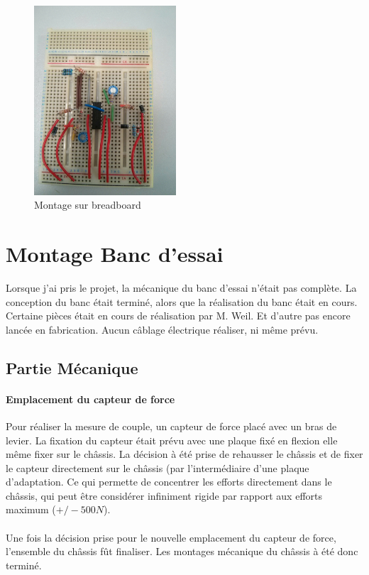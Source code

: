\documentclass[11pt]{article}
\begin{document}
\begin{figure}[!h]
    \centering
    \includegraphics[width=200px]{IMG_20160629_203932.jpg}
    \caption{Montage sur breadboard}
\end{figure}
\FloatBarrier


\section{Montage Banc d'essai}

Lorsque j'ai pris le projet, la mécanique du banc d'essai n'était pas complète. La conception du banc était terminé, alors que la réalisation du banc était en cours. Certaine pièces était en cours de réalisation par M. Weil. Et d'autre pas encore lancée en fabrication. Aucun câblage électrique réaliser, ni même prévu.

\subsection{Partie Mécanique}

\paragraph{Emplacement du capteur de force \\}

Pour réaliser la mesure de couple, un capteur de force placé avec un bras de levier. La fixation du capteur était prévu avec une plaque fixé en flexion elle même fixer sur le châssis. La décision à été prise de rehausser le châssis et de fixer le capteur directement sur le châssis (par l'intermédiaire d'une plaque d'adaptation. Ce qui permette de concentrer les efforts directement dans le châssis, qui peut être considérer infiniment rigide par rapport aux efforts maximum ($+/- 500 N$).\\
\\
Une fois la décision prise pour le nouvelle emplacement du capteur de force, l'ensemble du châssis fût finaliser. Les montages mécanique du châssis à été donc terminé.
\end{document}
